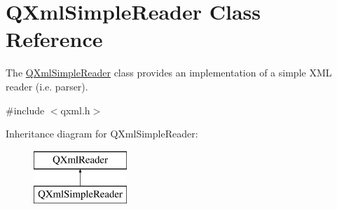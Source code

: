 \hypertarget{class_q_xml_simple_reader}{}\section{Q\+Xml\+Simple\+Reader Class Reference}
\label{class_q_xml_simple_reader}


The \mbox{\hyperlink{class_q_xml_simple_reader}{Q\+Xml\+Simple\+Reader}} class provides an implementation of a simple X\+ML reader (i.\+e. parser).  




{\ttfamily \#include $<$qxml.\+h$>$}

Inheritance diagram for Q\+Xml\+Simple\+Reader\+:\begin{figure}[H]
\begin{center}
\leavevmode
\includegraphics[height=2.000000cm]{class_q_xml_simple_reader}
\end{center}
\end{figure}
